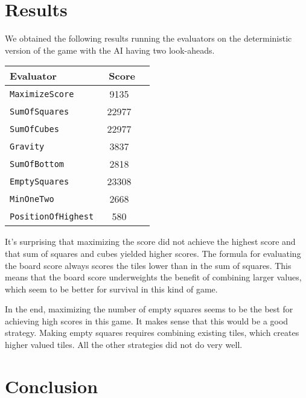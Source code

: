 \documentclass[11pt]{article}
\begin{document}
\section{Results}

We obtained the following results running the evaluators on the deterministic version of the game with the AI having two look-aheads.

\begin{tabular}{l c c}
\hline\hline %
Evaluator & \ Score
\\ [0.5ex] 
\hline %
 
\texttt{MaximizeScore} & 9135 \\

\texttt{SumOfSquares} &  22977 \\

\texttt{SumOfCubes} &  22977  \\

\texttt{Gravity} & 3837   \\

\texttt{SumOfBottom} & 2818  \\

\texttt{EmptySquares} & 23308  \\

\texttt{MinOneTwo} & 2668\\

\texttt{PositionOfHighest} & 580  \\
 
\hline %
\end{tabular}

It's surprising that maximizing the score did not achieve the highest score and that sum of squares and cubes yielded higher scores. The formula for evaluating the board score always scores the tiles lower than in the sum of squares. This means that the board score underweights the benefit of combining larger values, which seem to be better for survival in this kind of game. 

In the end, maximizing the number of empty squares seems to be the best for achieving high scores in this game. It makes sense that this would be a good strategy. Making empty squares requires combining existing tiles, which creates higher valued tiles. All the other strategies did not do very well. 

\section{Conclusion}
\end{document}
